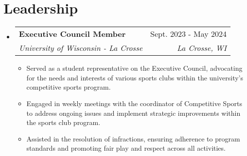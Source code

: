 \documentclass[letterpaper,11pt]{article}
\makeatletter
\newcommand{\resumeItem}[1]{
  \item\small{
    {#1 \vspace{-2pt}}
  }
}
\newcommand{\resumeSubheading}[4]{
  \vspace{-2pt}\item
    \begin{tabular*}{0.97\textwidth}[t]{l@{\extracolsep{\fill}}r}
      \textbf{#1} & #2 \\
      \textit{\small#3} & \textit{\small #4} \\
    \end{tabular*}\vspace{-7pt}
}
\newcommand{\resumeSubHeadingListStart}{\begin{itemize}[leftmargin=0.15in, label={}]}
\newcommand{\resumeSubHeadingListEnd}{\end{itemize}}
\newcommand{\resumeItemListStart}{\begin{itemize}}
\newcommand{\resumeItemListEnd}{\end{itemize}\vspace{-5pt}}
\makeatother
\begin{document}
\section{Leadership}
    \resumeSubHeadingListStart
        \resumeSubheading
      {\textbf{Executive Council Member}}{Sept. 2023 - May 2024}
      {University of Wisconsin - La Crosse}{La Crosse, WI}
        \resumeItemListStart
            \resumeItem{Served as a student representative on the Executive Council, advocating for the needs and interests of various sports clubs within the university's competitive sports program.}
            \resumeItem{Engaged in weekly meetings with the coordinator of Competitive Sports to address ongoing issues and implement strategic improvements within the sports club program.}
            \resumeItem{Assisted in the resolution of infractions, ensuring adherence to program standards and promoting fair play and respect across all activities.}
         \resumeItemListEnd
    \resumeSubHeadingListEnd
\end{document}
